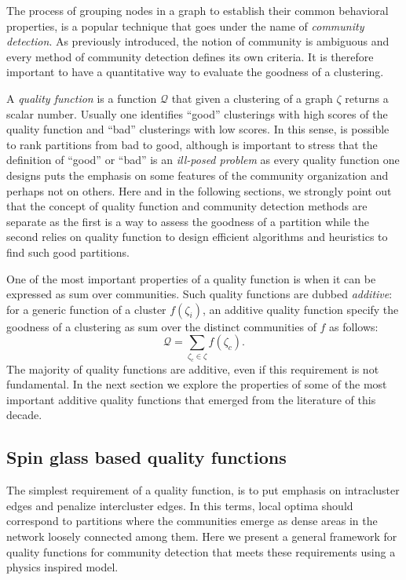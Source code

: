 The process of grouping nodes in a graph to establish their common behavioral properties, is a popular technique that goes under the name of \emph{community detection}. As previously introduced, the notion of community is ambiguous and every method of community detection defines its own criteria. It is therefore important to have a quantitative way to evaluate the goodness of a clustering.

A \emph{quality function} is a function $\mathcal{Q}$ that given a clustering of a graph $\zeta$ returns a scalar number. Usually one identifies ``good'' clusterings with high scores of the quality function and ``bad'' clusterings with low scores. In this sense, is possible to rank partitions from bad to good, although is important to stress that the definition of ``good'' or ``bad'' is an \emph{ill-posed problem} as every quality function one designs puts the emphasis on some features of the community organization and perhaps not on others.
Here and in the following sections, we strongly point out that the concept of quality function and community detection methods are separate as the first is a way to assess the goodness of a partition while the second relies on quality function to design efficient algorithms and heuristics to find such good partitions.

One of the most important properties of a quality function is when it can be expressed as sum over communities. Such quality functions are dubbed \emph{additive}: for a generic function of a cluster $f(\zeta_i)$, an additive quality function specify the goodness of a clustering as sum over the distinct communities of $f$ as follows:
\begin{equation}\label{eq:additive_quality}
\mathcal{Q} = \sum \limits_{\zeta_c \in \zeta} f(\zeta_c).
\end{equation}
The majority of quality functions are additive, even if this requirement is not fundamental. In the next section we explore the properties of some of the most important additive quality functions that emerged from the literature of this decade.

\subsection{Spin glass based quality functions}
The simplest requirement of a quality function, is to put emphasis on intracluster edges and penalize intercluster edges. In this terms, local optima should correspond to partitions where the communities emerge as dense areas in the network loosely connected among them.
Here we present a general framework for quality functions for community detection that meets these requirements using a physics inspired model.

